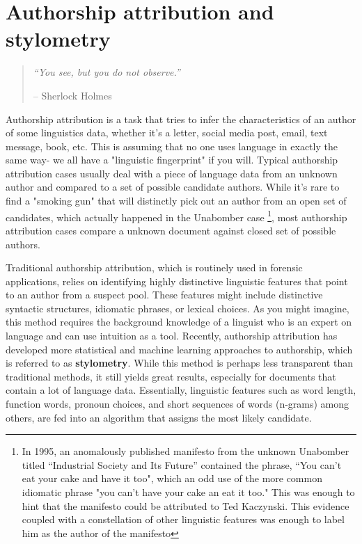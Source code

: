 \documentclass{article}
\let\oldsection\section
\renewcommand\section{\clearpage\oldsection}
\begin{document}

\section{Authorship attribution and stylometry}
\begin{quote}
\textit{``You see, but you do not observe.''}

-- Sherlock Holmes
\end{quote}

Authorship attribution is a task that tries to infer the characteristics of an author of some linguistics data, whether it's a letter, social media post, email, text message, book, etc. This is assuming that no one uses language in exactly the same way- we all have a "linguistic fingerprint" if you will. Typical authorship attribution cases usually deal with a piece of language data from an unknown author and compared to a set of possible candidate authors. While it's rare to find a "smoking gun" that will distinctly pick out an author from an open set of candidates, which actually happened in the Unabomber case \footnote{In 1995, an anomalously published manifesto from the unknown Unabomber titled “Industrial Society and Its Future” contained the phrase, “You can’t eat your cake and have it too", which an odd use of the more common idiomatic phrase "you can't have your cake an eat it too." This was enough to hint that the manifesto could be attributed to Ted Kaczynski. This evidence coupled with a constellation of other linguistic features was enough to label him as the author of the manifesto}, most authorship attribution cases compare a unknown document against closed set of possible authors. 

Traditional authorship attribution, which is routinely used in forensic applications, relies on identifying highly distinctive linguistic features that point to an author from a suspect pool. These features might include distinctive syntactic structures, idiomatic phrases, or lexical choices. As you might imagine, this method requires the background knowledge of a linguist who is an expert on language and can use intuition as a tool. Recently, authorship attribution has developed more statistical and machine learning approaches to authorship, which is referred to as \textbf{stylometry}. While this method is perhaps less transparent than traditional methods, it still yields great results, especially for documents that contain a lot of language data. Essentially, linguistic features such as word length, function words, pronoun choices, and short sequences of words (n-grams) among others, are fed into an algorithm that assigns the most likely candidate. 
\end{document}
